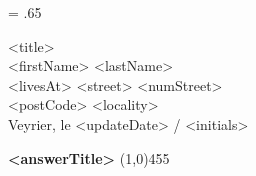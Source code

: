 {
	\leftskip = .65\hsize

	<title> \\
	<firstName> <lastName> \\
	<livesAt> %
	<street> <numStreet> \\
	<postCode> <locality> \\
	\bigbreak
	\bigbreak
	Veyrier, le <updateDate> / <initials>
	\bigbreak
}

\begin{flushleft}
	\textbf{<answerTitle>}
	\line(1,0){455}
\end{flushleft}
\bigbreak